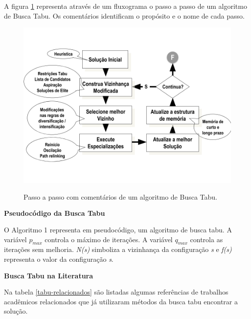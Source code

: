 A figura \ref{taboo-image} representa através de um fluxograma o passo a passo de um algoritmo de Busca Tabu. Os comentários identificam o propósito e o nome de cada passo. 


\begin{figure}[H]
  \centering
  \caption{Passo a passo com comentários de um algoritmo de Busca Tabu.}
 \includegraphics[scale=0.4]{imagens/tabu.png} \par
\bigskip
    \cite[p. 97]{goldbarg}
    \label{taboo-image}
\end{figure}


\textbf{Pseudocódigo da Busca Tabu} \par

O Algoritmo 1 representa em pseudocódigo, um algoritmo de busca tabu. A variável $p_{max}$ controla o máximo de iterações. A variável $q_{max}$ controla as iterações sem melhoria. \emph{N(s)} simboliza a vizinhança da configuração \emph{s} e \emph{f(s)} representa o valor da configuração \emph{s}.



\textbf{Busca Tabu na Literatura} \par
Na tabela \ref{tabu-relacionados} são listadas algumas referências de trabalhos acadêmicos relacionados que já utilizaram métodos da busca tabu encontrar a solução.




